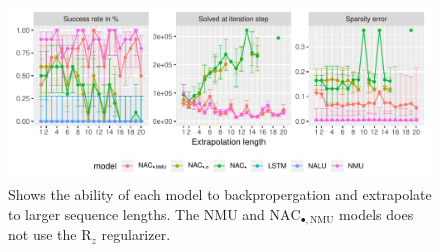 \begin{figure}[h]
\centering
\includegraphics[width=\linewidth,trim={0 0.5cm 0 0},clip]{results/sequential_mnist_prod_long_ablation.pdf}
\caption{Shows the ability of each model to backpropergation and extrapolate to larger sequence lengths. The NMU and $\mathrm{NAC}_{\bullet,\mathrm{NMU}}$ models does not use the $\mathrm{R}_z$ regularizer.} 
\label{fig:sequential-mnist-prod-ablation}
\end{figure}
